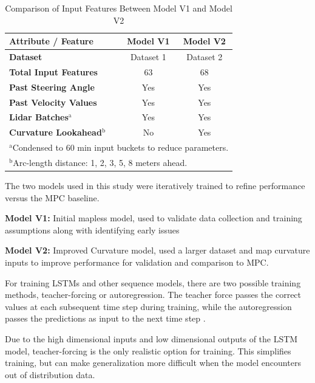 \documentclass[conference]{IEEEtran}
\begin{document}
\begin{table}[htbp]
    \renewcommand{\arraystretch}{1.3} %
    \caption{Comparison of Input Features Between Model V1 and Model V2}
    \label{tab:feature_comparison}
    \centering
    \begin{tabular}{l c c}
        \hline\hline
        \textbf{Attribute / Feature} & \textbf{Model V1} & \textbf{Model V2} \\
        \hline
        \textbf{Dataset} & Dataset 1 & Dataset 2 \\
        \textbf{Total Input Features} & 63 & 68 \\
        \textbf{Past Steering Angle} & Yes & Yes \\
        \textbf{Past Velocity Values} & Yes & Yes \\
        \textbf{Lidar Batches$^{\mathrm{a}}$} & Yes & Yes \\
        \textbf{Curvature Lookahead$^{\mathrm{b}}$} & No & Yes \\
        \hline
        \multicolumn{3}{l}{$^{\mathrm{a}}$Condensed to 60 min input buckets to reduce parameters.} \\
        \multicolumn{3}{l}{$^{\mathrm{b}}$Arc-length distance: 1, 2, 3, 5, 8 meters ahead.} \\
        \hline\hline
    \end{tabular}
\end{table}

The two models used in this study were iteratively trained to refine performance versus the MPC baseline. 

\textbf{Model V1:} Initial mapless model, used to validate data collection and training assumptions along with identifying early issues

\textbf{Model V2:} Improved Curvature model, used a larger dataset and map curvature inputs to improve performance for validation and comparison to MPC.

For training LSTMs and other sequence models, there are two possible training methods, teacher-forcing or autoregression. The teacher force passes the correct values at each subsequent time step during training, while the autoregression passes the predictions as input to the next time step \cite{davies2024teacherforcing}.

Due to the high dimensional inputs and low dimensional outputs of the LSTM model, teacher-forcing is the only realistic option for training. This simplifies training, but can make generalization more difficult when the model encounters out of distribution data. 
\end{document}
